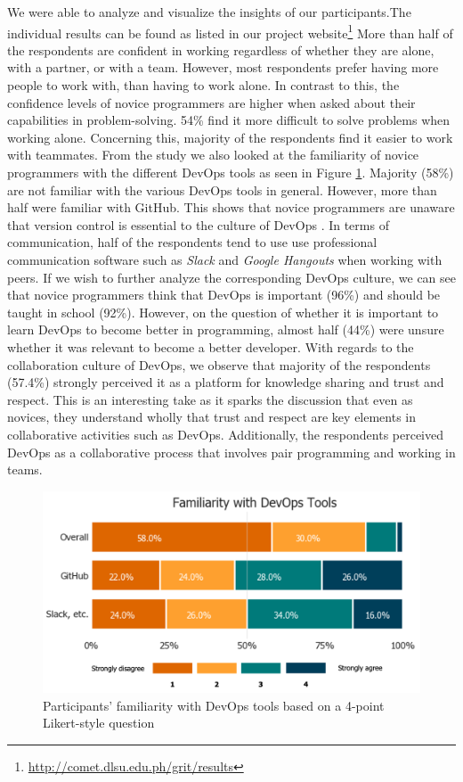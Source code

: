 \documentclass{sigchi}
\begin{document}
We were able to analyze and visualize the insights of our participants.The individual results can be found as listed in our project website\footnote{\url{http://comet.dlsu.edu.ph/grit/results}}
More than half of the respondents are confident in working regardless of whether they are alone, with a partner, or with a team. However, most respondents prefer having more people to work with, than having to work alone. In contrast to this, the confidence levels of novice programmers are higher when asked about their capabilities in problem-solving. 54\% find it more difficult to solve problems when working alone. Concerning this, majority of the respondents find it easier to work with teammates. From the study we also looked at the familiarity of novice programmers with the different DevOps tools as seen in Figure \ref{fig:likerts}. Majority (58\%) are not familiar with the various DevOps tools in general. However, more than half were familiar with GitHub. This shows that novice programmers are unaware that version control is essential to the culture of DevOps \cite{davis2016effective}. In terms of communication, half of the respondents tend to use use professional communication software such as \textit{Slack} and \textit{Google Hangouts} when working with peers. If we wish to further analyze the corresponding DevOps culture, we can see that novice programmers think that DevOps is important (96\%) and should be taught in school (92\%). However, on the question of whether it is important to learn DevOps to become better in programming, almost half (44\%) were unsure whether it was relevant to become a better developer. With regards to the collaboration culture of DevOps, we observe that majority of the respondents (57.4\%) strongly perceived it as a platform for knowledge sharing and trust and respect. This is an interesting take as it sparks the discussion that even as novices, they understand wholly that trust and respect are key elements in collaborative activities such as DevOps. Additionally, the respondents perceived DevOps as a collaborative process that involves pair programming and working in teams. 

\begin{figure}[t]
\centering
 \includegraphics[width=0.9\columnwidth]{figures/tools-summary.png}
    \caption{Participants' familiarity with DevOps tools based on a 4-point Likert-style question}\label{fig:likerts}
\end{figure}
\end{document}
